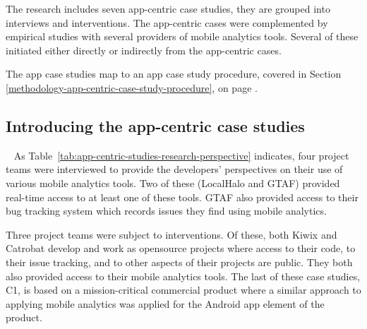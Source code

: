 The research includes seven app-centric case studies, they are grouped into interviews and interventions. The app-centric cases were complemented by empirical studies with several providers of mobile analytics tools. Several of these initiated either directly or indirectly from the app-centric cases. 


The app case studies map to an app case study procedure, covered in Section \ref{methodology-app-centric-case-study-procedure}, on page \pageref{methodology-app-centric-case-study-procedure}. 

\subsection{Introducing the app-centric case studies}~\label{methodology-introducing-the-app-centric-case-studies-section}
As Table~\ref{tab:app-centric-studies-research-perspective} indicates, four project teams were interviewed to provide the developers' perspectives on their use of various mobile analytics tools. Two of these (LocalHalo and GTAF) provided real-time access to at least one of these tools. GTAF also provided access to their bug tracking system which records issues they find using mobile analytics.

Three project teams were subject to interventions. Of these, both Kiwix and Catrobat develop and work as opensource projects where access to their code, to their issue tracking, and to other aspects of their projects are public. They both also provided access to their mobile analytics tools. The last of these case studies, C1, is based on a mission-critical commercial product where a similar approach to applying mobile analytics was applied for the Android app element of the product.


